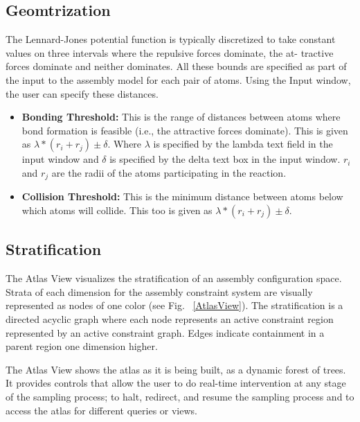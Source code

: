 \documentclass[10pt]{article}
\begin{document}
\subsection{Geomtrization}
The Lennard-Jones potential function is typically discretized to
take constant values on three intervals where the repulsive forces dominate, the at-
tractive forces dominate and neither dominates. All these bounds are specified as part
of the input to the assembly model for each pair of atoms. Using the Input window, the user can specify these distances. 

\begin{itemize}

\item \textbf{Bonding Threshold:} This is the range of distances between atoms
		where bond formation is feasible (i.e., the attractive forces dominate). 
		This is given as $\lambda*(r_i+r_j)
		\pm \delta$. Where $\lambda$ is specified by the lambda text field in
		the input window and $\delta$ is specified by the delta text box in the
		input window. $r_i$ and $r_j$ are the radii of the atoms participating
		in the reaction. 

\item \textbf{Collision Threshold:} This is the minimum distance between atoms
		below which atoms will collide. This too is given as $\lambda*(r_i+r_j)
		\pm \delta$.

\end{itemize}

\subsection{Stratification}

The Atlas View visualizes the stratification of an assembly configuration
space. Strata of each dimension for the assembly constraint system are visually
represented as nodes of one color (see Fig. ~\ref{AtlasView}). The
stratification is a directed acyclic graph where each node represents an active
constraint region represented by an active constraint graph. Edges indicate
containment in a parent region one dimension higher.

The Atlas View shows the atlas as it is being built, as a dynamic forest of
trees.  It provides controls that allow the user to do real-time intervention
at any stage of the sampling process; to halt, redirect, and resume the
sampling process and to access the atlas for different queries or views.
\end{document}
